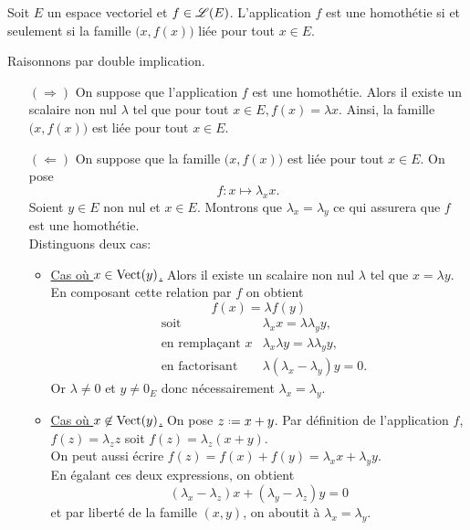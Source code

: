 \begin{prop}{}
    Soit $E$ un espace vectoriel et $f \in \mathscr{L}(E)$. L'application $f$ est une homothétie si et seulement si la famille $\big(x, f(x) \big)$ liée pour tout $x \in E$.
\end{prop}

\begin{marginfigure}
    \centering
    
\end{marginfigure}

\begin{preuve}
    Raisonnons par double implication. 
    \begin{itemize}
        \item[$(\Rightarrow)$] On suppose que l'application $f$ est une homothétie. Alors il existe un scalaire non nul $\lambda$ tel que pour tout $x \in E, f(x) = \lambda x$. Ainsi, la famille $\big(x, f(x) \big)$ est liée pour tout $x \in E$. 
        \item[$(\Leftarrow)$]  On suppose que la famille $\big(x, f(x) \big)$ est liée pour tout $x \in E$. On pose 
        $$f:x \mapsto \lambda_x x.$$
        Soient $y \in E$ non nul et $x \in E$. Montrons que $\lambda_x = \lambda_{y}$ ce qui assurera que $f$ est une homothétie. \\
        Distinguons deux cas:
        \begin{itemize}
            \item \underline{Cas où $x \in \mathrm{Vect}(y)$.} Alors il existe un scalaire non nul $\lambda$ tel que $x = \lambda y$. En composant cette relation par $f$ on obtient
            $$f(x) = \lambda f(y)$$
            \begin{align*}
                &\text{soit} &\lambda_x x = \lambda \lambda_{y} y, \\
                &\text{en remplaçant $x$} &\lambda_x \lambda y = \lambda \lambda_{y} y, \\
                &\text{en factorisant} &\lambda (\lambda_x - \lambda_{y}) y = 0.
            \end{align*}
            Or $\lambda \not= 0$ et $y \not= 0_E$ donc nécessairement $\lambda_x = \lambda_{y}$.
            \item \underline{Cas où $x \not \in \mathrm{Vect}(y)$.} On pose $z \defeq x + y$. Par définition de l'application $f$, $f(z) = \lambda_z z$ soit $f(z) = \lambda_z(x + y)$. \\
            On peut aussi écrire $f(z) = f(x) + f(y) = \lambda_x x + \lambda_y y$. \\
            En égalant ces deux expressions, on obtient 
            $$(\lambda_x - \lambda_z) x + (\lambda_{y} - \lambda_z) y = 0$$
            et par liberté de la famille $(x, y)$, on aboutit à $\lambda_x = \lambda_{y}$.
        \end{itemize}
    \end{itemize}
\end{preuve}
